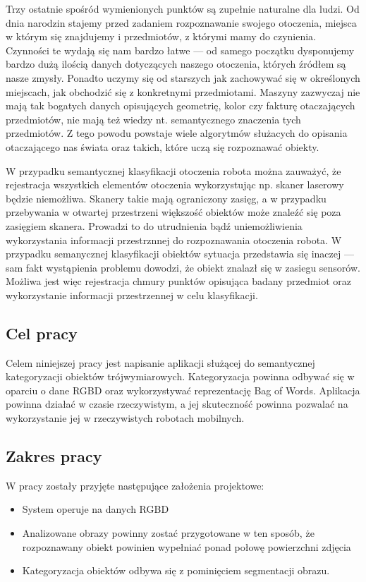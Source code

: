 \documentclass[a4paper,10pt,twocolumn]{article}
\begin{document}
  Trzy ostatnie spośród wymienionych punktów są zupełnie naturalne dla ludzi. Od dnia narodzin stajemy przed zadaniem rozpoznawanie swojego otoczenia, miejsca w którym się znajdujemy i przedmiotów, z którymi mamy do czynienia. Czynności te wydają się nam bardzo łatwe --- od samego początku dysponujemy bardzo dużą ilością danych dotyczących naszego otoczenia, których źródłem są nasze zmysły. Ponadto uczymy się od starszych jak zachowywać się w określonych miejscach, jak obchodzić się z konkretnymi przedmiotami. Maszyny zazwyczaj nie mają tak bogatych danych opisujących geometrię, kolor czy fakturę otaczających przedmiotów, nie mają też wiedzy nt. semantycznego znaczenia tych przedmiotów. Z tego powodu powstaje wiele algorytmów służacych do opisania otaczającego nas świata oraz takich, które uczą się rozpoznawać obiekty.
  
  W przypadku semantycznej klasyfikacji otoczenia robota można zauważyć, że rejestracja wszystkich elementów otoczenia wykorzystując np. skaner laserowy będzie niemożliwa. Skanery takie mają ograniczony zasięg, a w przypadku przebywania w otwartej przestrzeni większość obiektów może znaleźć się poza zasięgiem skanera. Prowadzi to do utrudnienia bądź uniemożliwienia wykorzystania informacji przestrznnej do rozpoznawania otoczenia robota. W przypadku semanycznej klasyfikacji obiektów sytuacja przedstawia się inaczej --- sam fakt wystąpienia problemu dowodzi, że obiekt znalazł się w zasiegu sensorów. Możliwa jest więc rejestracja chmury punktów opisująca badany przedmiot oraz wykorzystanie informacji przestrzennej w celu klasyfikacji.
  

\subsection{Cel pracy}

  Celem niniejszej pracy jest napisanie aplikacji służącej do semantycznej kategoryzacji obiektów trójwymiarowych. Kategoryzacja powinna odbywać się w oparciu o dane RGBD oraz wykorzystywać reprezentację Bag of Words. Aplikacja powinna działać w czasie rzeczywistym, a jej skuteczność powinna pozwalać na wykorzystanie jej w rzeczywistych robotach mobilnych.

\subsection{Zakres pracy}

  W pracy zostały przyjęte następujące założenia projektowe:
  \begin{itemize}
   \item System operuje na danych RGBD
   \item Analizowane obrazy powinny zostać przygotowane w ten sposób, że rozpoznawany obiekt powinien wypełniać ponad połowę powierzchni zdjęcia
   \item Kategoryzacja obiektów odbywa się z pominięciem segmentacji obrazu.
  \end{itemize}
  
\end{document}
